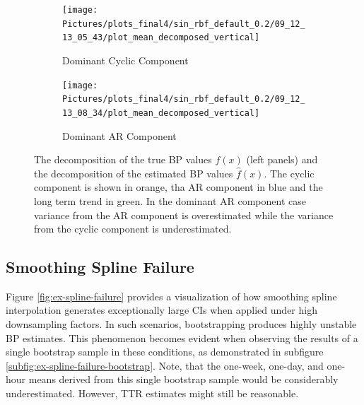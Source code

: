 \begin{figure}

\begin{subfigure}{\textwidth}
    \centering
    \texttt{[image: 
        Pictures/plots\_final4/sin\_rbf\_default\_0.2/09\_12\_13\_05\_43/plot\_mean\_decomposed\_vertical]}
  \caption{Dominant Cyclic Component}
\end{subfigure}

\begin{subfigure}{\textwidth}
    \centering
    \texttt{[image: 
        Pictures/plots\_final4/sin\_rbf\_default\_0.2/09\_12\_13\_08\_34/plot\_mean\_decomposed\_vertical]}
  \caption{Dominant AR Component}
    \label{subfig:mean-decomposed-ar}
\end{subfigure}\hfill
\label{fig:mean-decomposed-ar-cyclic}
\caption[Dominant Cyclic Component vs. Dominant AR Component - Decompostion of $f(x)$]{
    The decomposition of the true BP values $f(x)$ (left panels)  and the decomposition
    of the estimated BP values $\hat{f}(x)$. The cyclic component is shown in orange,
    tha AR component in blue and the long term trend in green. In the dominant AR
component case variance from the AR component is overestimated while the
variance from the cyclic component is underestimated.
}
\end{figure}

\subsection{Smoothing Spline Failure}

Figure \ref{fig:ex-spline-failure} provides a visualization of how smoothing
spline interpolation generates exceptionally large CIs when
applied under high downsampling factors.
In such scenarios, bootstrapping produces highly unstable BP estimates.
This phenomenon becomes evident when observing the results of a single bootstrap
sample in these conditions, as demonstrated in subfigure \ref{subfig:ex-spline-failure-bootstrap}.
Note, that the one-week, one-day, and one-hour means derived from this single bootstrap sample
would be considerably underestimated.
However, TTR estimates might still be reasonable.

